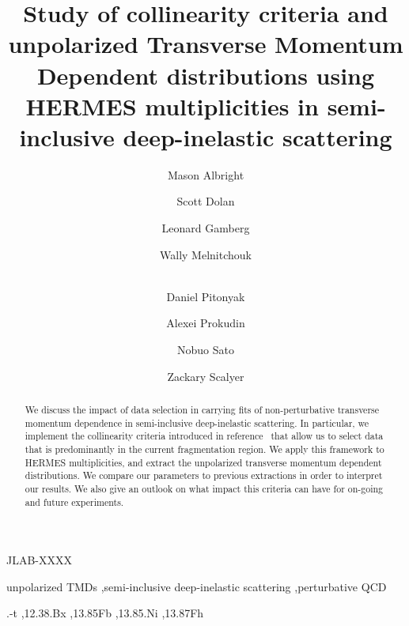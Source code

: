 \documentclass[final,3p,times,onecolumn,sort&compress,hidelinks]{elsarticle}
\begin{document}
\vspace{-3.0cm}
\begin{flushright}
JLAB-XXXX
\vspace{0.5cm}
\end{flushright}

\begin{frontmatter}

\author{Mason Albright}
\author{Scott Dolan}
\author{Leonard Gamberg}
\author{Wally Melnitchouk}
\author{\\Daniel Pitonyak}
\author{Alexei Prokudin} 
\author{Nobuo Sato}
\author{Zackary  Scalyer}
\address[label1]{College of Engineering, Penn State University, State College, Pennsylvania 16801, USA}
\address[label4]{Dipartimento di Fisica Teorica, Universit$\grave{a}$ di Torino, Via P. Giuria 1, I-10125 Torino, Italy}
\address[label5]{Dipartimento di Fisica, Universit$\grave{a}$ di Cagliari, Cittadella Universitaria, I-09042 Monserrato
(CA), Italy}
\address[label2]{Division of Science, Penn State University Berks, Reading, Pennsylvania 19610, USA}
\address[label3]{Theory Center, Jefferson Lab, 12000 Jefferson Avenue, Newport News, Virginia 23606, USA}
\address[label4]{Department of Mathematics and Statistics, Villanova University, Villanova, PA 19085, USA}


\title{Study of collinearity criteria and unpolarized Transverse Momentum Dependent distributions using HERMES multiplicities in semi-inclusive deep-inelastic scattering}


\begin{abstract}

   We discuss the impact of data selection in carrying  fits of 
    non-perturbative transverse momentum dependence in semi-inclusive deep-inelastic scattering. In particular, we implement the  collinearity criteria introduced in reference~\cite{Boglione:2016bph} that allow us to select data  that is  predominantly in the current fragmentation region.  We apply this framework to HERMES multiplicities, and extract  the unpolarized transverse momentum dependent distributions.    We compare our parameters to previous extractions in order to interpret our results.  We also give an outlook on what impact this criteria can have for on-going and future experiments.
\end{abstract}



\begin{keyword}
unpolarized TMDs \sep semi-inclusive deep-inelastic scattering \sep perturbative QCD

.-t \sep 12.38.Bx \sep  13.85Fb \sep 13.85.Ni \sep 13.87Fh


\end{keyword}

\end{frontmatter}
\end{document}
